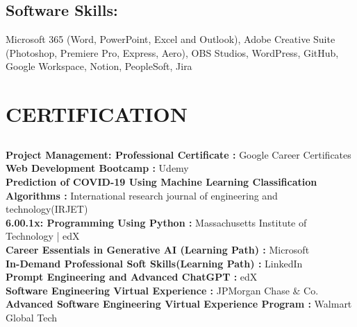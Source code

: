 \documentclass[a4paper]{deedy-resume} %
\begin{document}
\begin{minipage}[t]{0.33\textwidth}
\sectionspace %



\subsection{Software Skills: }

Microsoft 365 (Word, PowerPoint, Excel and Outlook), 
Adobe Creative Suite (Photoshop, Premiere Pro, Express, Aero),
OBS Studios, WordPress, GitHub, Google Workspace, Notion, PeopleSoft, Jira


\sectionspace %


\section{CERTIFICATION}




\subsection{}


\textbullet{} \textbf{Project Management: Professional Certificate :}  Google Career Certificates   \\
\textbullet{}\textbf{Web Development Bootcamp :}  Udemy  \\
\textbullet{}\textbf{Prediction of COVID-19 Using Machine Learning Classification Algorithms :}  International research journal of engineering and technology(IRJET)   \\
\textbullet{}\textbf{6.00.1x: Programming Using Python :}  Massachusetts Institute of Technology | edX \\
\textbullet{}\textbf{Career Essentials in Generative AI (Learning Path) :} Microsoft  \\
\textbullet{}\textbf{In-Demand Professional Soft Skills(Learning Path) :} LinkedIn  \\
\textbullet{}\textbf{Prompt Engineering and Advanced ChatGPT :}  edX  \\
\textbullet{}\textbf{Software Engineering Virtual Experience :}  JPMorgan Chase \& Co. \\
\textbullet{}\textbf{Advanced Software Engineering Virtual Experience Program :}  Walmart Global Tech \\


\sectionspace %






\end{minipage} %
\end{document}
